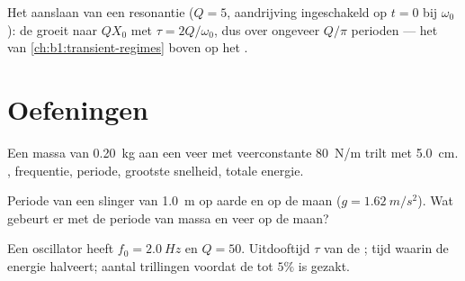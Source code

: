 \begin{omfigure}

{\small Het aanslaan van een resonantie ($Q = 5$, aandrijving ingeschakeld op $t = 0$
bij $\omega_0$): de  groeit naar $QX_0$ met 
$\tau = 2Q/\omega_0$, dus over ongeveer $Q/\pi$ perioden --- het
 van \cref{ch:b1:transient-regimes} boven op het .}
\end{omfigure}

\section{Oefeningen}

\begin{exercise}[$\star$]\label{exo:b1:oscillators-resonance:1}
Een massa van \qty{0.20}{kg} aan een veer met veerconstante \qty{80}{N/m} trilt
met  \qty{5.0}{cm}. , frequentie, periode,
grootste snelheid, totale energie.
\end{exercise}

\begin{exercise}[$\star$]\label{exo:b1:oscillators-resonance:2}
Periode van een slinger van \qty{1.0}{m} op aarde en op de maan
($g = \qty{1.62}{m/s^2}$). Wat gebeurt er met de periode van massa en veer op de
maan?
\end{exercise}

\begin{exercise}[$\star$]\label{exo:b1:oscillators-resonance:3}
Een oscillator heeft $f_0 = \qty{2.0}{Hz}$ en $Q = 50$. Uitdooftijd $\tau$
van de ; tijd waarin de energie halveert; aantal trillingen
voordat de  tot $5\%$ is gezakt.
\end{exercise}

